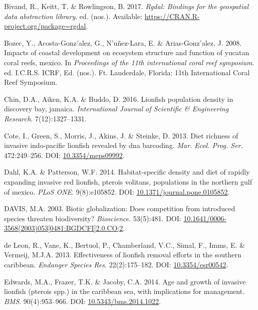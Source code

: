 \documentclass[12pt,]{article}
\begin{document}
\hypertarget{ref-rgdal_2017}{}
Bivand, R., Keitt, T. \& Rowlingson, B. 2017. \emph{Rgdal: Bindings for
the geospatial data abstraction library}. ed. (nos.). Available:
\url{https://CRAN.R-project.org/package=rgdal}.

\hypertarget{ref-bozec_2008}{}
Bozec, Y., Acosta-Gonz\a'alez, G., N\a'uñez-Lara, E. \&
Arias-Gonz\a'alez, J. 2008. Impacts of coastal development on ecosystem
structure and function of yucatan coral reefs, mexico. In
\emph{Proceedings of the 11th international coral reef symposium}. ed.
I.C.R.S. ICRF, Ed. (nos.). Ft. Lauderdale, Florida: 11th International
Coral Reef Symposium.

\hypertarget{ref-chin_2016}{}
Chin, D.A., Aiken, K.A. \& Buddo, D. 2016. Lionfish population density
in discovery bay, jamaica. \emph{International Journal of Scientific \&
Engineering Research}. 7(12):1327--1331.

\hypertarget{ref-cote_2013}{}
Cote, I., Green, S., Morris, J., Akins, J. \& Steinke, D. 2013. Diet
richness of invasive indo-pacific lionfish revealed by dna barcoding.
\emph{Mar. Ecol. Prog. Ser.} 472:249--256. DOI:
\href{https://doi.org/10.3354/meps09992}{10.3354/meps09992}.

\hypertarget{ref-dahl_2014}{}
Dahl, K.A. \& Patterson, W.F. 2014. Habitat-specific density and diet of
rapidly expanding invasive red lionfish, pterois volitans, populations
in the northern gulf of mexico. \emph{PLoS ONE}. 9(8):e105852. DOI:
\href{https://doi.org/10.1371/journal.pone.0105852}{10.1371/journal.pone.0105852}.

\hypertarget{ref-davis_2003}{}
DAVIS, M.A. 2003. Biotic globalization: Does competition from introduced
species threaten biodiversity? \emph{Bioscience}. 53(5):481. DOI:
\href{https://doi.org/10.1641/0006-3568(2003)053\%5B0481:BGDCFI\%5D2.0.CO;2}{10.1641/0006-3568(2003)053{[}0481:BGDCFI{]}2.0.CO;2}.

\hypertarget{ref-deleon_2013}{}
de Leon, R., Vane, K., Bertuol, P., Chamberland, V.C., Simal, F., Imms,
E. \& Vermeij, M.J.A. 2013. Effectiveness of lionfish removal efforts in
the southern caribbean. \emph{Endanger Species Res}. 22(2):175--182.
DOI: \href{https://doi.org/10.3354/esr00542}{10.3354/esr00542}.

\hypertarget{ref-edwards_2014}{}
Edwards, M.A., Frazer, T.K. \& Jacoby, C.A. 2014. Age and growth of
invasive lionfish (pterois spp.) in the caribbean sea, with implications
for management. \emph{BMS}. 90(4):953--966. DOI:
\href{https://doi.org/10.5343/bms.2014.1022}{10.5343/bms.2014.1022}.
\end{document}
